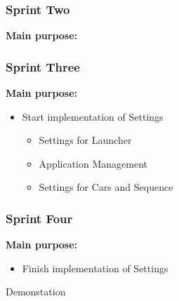 \begin{frame}
\frametitle{Sprint Two}
\textbf{Main purpose:}\\

\end{frame}

\begin{frame}
\frametitle{Sprint Three}
\textbf{Main purpose:}
\pause
\begin{itemize}
\item Start implementation of Settings
\begin{itemize}
\pause
\item Settings for Launcher
\pause
\item Application Management
\pause
\item Settings for Cars and Sequence
\end{itemize}
\end{itemize}
\end{frame}

\begin{frame}
\frametitle{Sprint Four}
\textbf{Main purpose:}
\pause
\begin{itemize}
\item Finish implementation of Settings
\pause
\end{itemize}

\begin{center}
Demonstation
\end{center}
\end{frame}